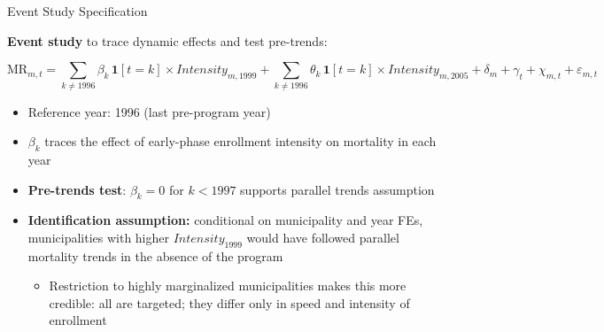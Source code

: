 \documentclass[aspectratio=169,usenames,dvipsnames]{beamer}
\begin{document}

\begin{frame}{Event Study Specification}\label{eventstudy_spec}
\small

\textbf{Event study} to trace dynamic effects and test pre-trends:

\vspace{2pt}
\begin{equation*}
\text{MR}_{m,t}
= \sum_{k \neq 1996} \beta_{k}\,\mathbf{1}[t=k] \times \textit{Intensity}_{m,1999}
+ \sum_{k \neq 1996} \theta_{k}\,\mathbf{1}[t=k] \times \textit{Intensity}_{m,2005}
+ \delta_{m} + \gamma_{t} + \chi_{m,t} + \varepsilon_{m,t}
\end{equation*}

\vspace{4pt}

\begin{itemize}
  \item Reference year: 1996 (last pre-program year)
  \item $\beta_k$ traces the effect of early-phase enrollment intensity on mortality in each year
  \item \textbf{Pre-trends test}: $\beta_k = 0$ for $k < 1997$ supports parallel trends assumption
  \vspace{4pt}
  \item \textbf{Identification assumption:} conditional on municipality and year FEs, municipalities with higher $\textit{Intensity}_{1999}$ would have followed parallel mortality trends in the absence of the program
    \begin{itemize}
      \item Restriction to highly marginalized municipalities makes this more credible: all are targeted; they differ only in speed and intensity of enrollment
    \end{itemize}
\end{itemize}

\end{frame}

\end{document}
